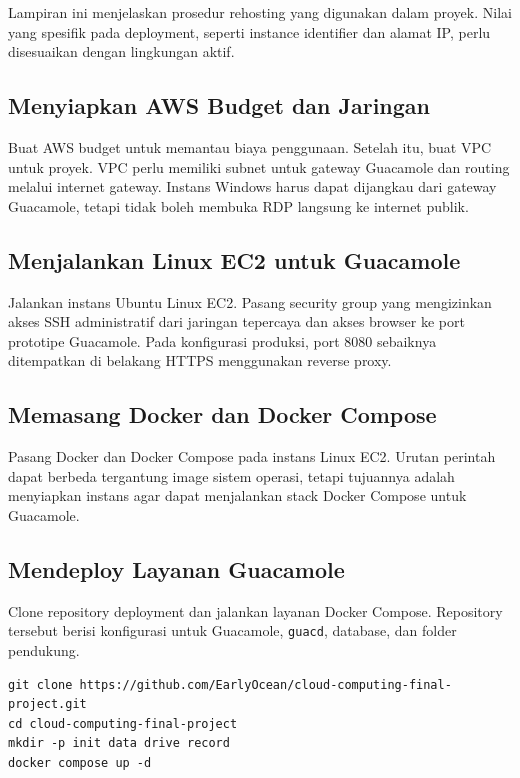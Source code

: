 \documentclass[conference]{IEEEtran}
\begin{document}
Lampiran ini menjelaskan prosedur rehosting yang digunakan dalam proyek. Nilai yang spesifik pada deployment, seperti instance identifier dan alamat IP, perlu disesuaikan dengan lingkungan aktif.

\subsection{Menyiapkan AWS Budget dan Jaringan}

Buat AWS budget untuk memantau biaya penggunaan. Setelah itu, buat VPC untuk proyek. VPC perlu memiliki subnet untuk gateway Guacamole dan routing melalui internet gateway. Instans Windows harus dapat dijangkau dari gateway Guacamole, tetapi tidak boleh membuka RDP langsung ke internet publik.

\subsection{Menjalankan Linux EC2 untuk Guacamole}

Jalankan instans Ubuntu Linux EC2. Pasang security group yang mengizinkan akses SSH administratif dari jaringan tepercaya dan akses browser ke port prototipe Guacamole. Pada konfigurasi produksi, port 8080 sebaiknya ditempatkan di belakang HTTPS menggunakan reverse proxy.

\subsection{Memasang Docker dan Docker Compose}

Pasang Docker dan Docker Compose pada instans Linux EC2. Urutan perintah dapat berbeda tergantung image sistem operasi, tetapi tujuannya adalah menyiapkan instans agar dapat menjalankan stack Docker Compose untuk Guacamole.

\subsection{Mendeploy Layanan Guacamole}

Clone repository deployment dan jalankan layanan Docker Compose. Repository tersebut berisi konfigurasi untuk Guacamole, \texttt{guacd}, database, dan folder pendukung.

\begin{lstlisting}[style=code]
git clone https://github.com/EarlyOcean/cloud-computing-final-project.git
cd cloud-computing-final-project
mkdir -p init data drive record
docker compose up -d
\end{lstlisting}
\end{document}
